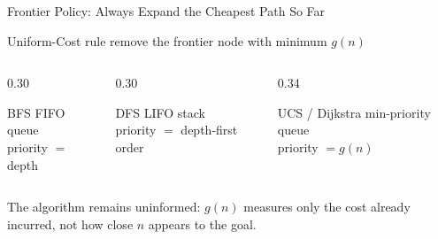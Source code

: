 \documentclass[aspectratio=169,10pt]{beamer}
\begin{document}
\begin{frame}[shrink=20]{Frontier Policy: Always Expand the Cheapest Path So Far}
  \begin{block}{Uniform-Cost rule}
    \centering
    remove the frontier node with minimum $g(n)$
  \end{block}

  \begin{columns}[T,onlytextwidth]
    \begin{column}{0.30\textwidth}
      \begin{block}{BFS}
        FIFO queue\\[0.06in]
        priority $=$ depth
      \end{block}
    \end{column}

    \begin{column}{0.30\textwidth}
      \begin{block}{DFS}
        LIFO stack\\[0.06in]
        priority $=$ depth-first order
      \end{block}
    \end{column}

    \begin{column}{0.34\textwidth}
      \begin{block}{UCS / Dijkstra}
        min-priority queue\\[0.06in]
        priority $=g(n)$
      \end{block}
    \end{column}
  \end{columns}

  \begin{keyidea}
    The algorithm remains uninformed: $g(n)$ measures only the cost already incurred, not how close $n$ appears to the goal.
  \end{keyidea}
\end{frame}
\end{document}
